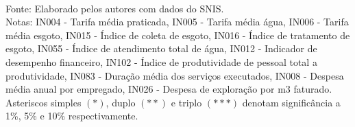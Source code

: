 
\begin{table}[H] \centering 
\begin{minipage}{1\textwidth}
  \caption{Coeficientes angulares das regressões estimadas para cada índice} 
  \label{tab:reg} 
  \small
\footnotesize \\
	Fonte: Elaborado pelos autores com dados do SNIS. \\
	Notas: IN004 - Tarifa média praticada,
	IN005 - Tarifa média água,
	IN006 - Tarifa média esgoto,		
	IN015 - Índice de coleta de esgoto,
	IN016 - Índice de tratamento de esgoto,
	IN055 - Índice de atendimento total de água,	
	IN012 - Indicador de desempenho financeiro,
	IN102 - Índice de produtividade de pessoal total a produtividade,
	IN083 - Duração média dos serviços executados,	
	IN008 - Despesa média anual por empregado,
	IN026 - Despesa de exploração por m3 faturado. \\
	Asteriscos simples $(*)$, duplo $(**)$ e triplo $(***)$ denotam significância a 1\%, 5\% e 10\% respectivamente. 
\end{minipage}
\end{table} 


